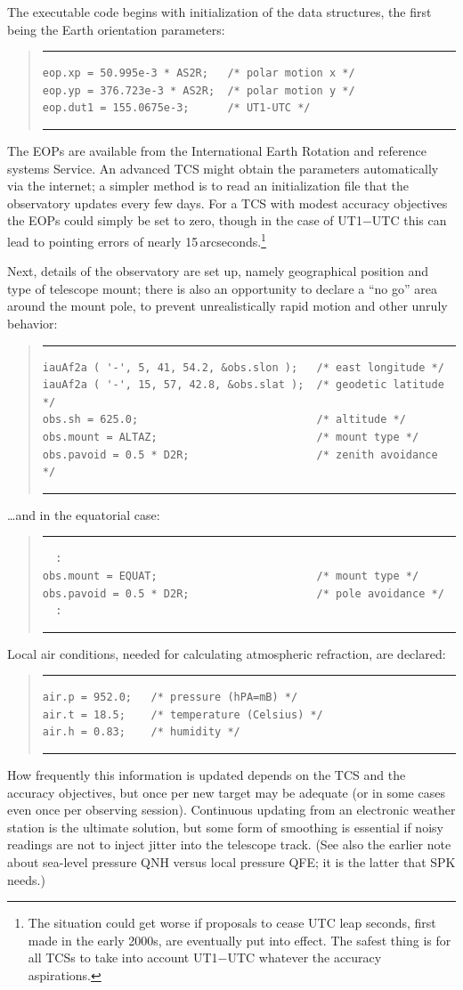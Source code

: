 \documentclass[11pt,fleqn,twoside,\paper]{article}
\renewcommand{\_}{{\tt\char'137}}     %
\newcommand{\scode}     {\goodbreak
                         \begin{quote}
                         \vspace{-6ex}
                         \rule[-2ex]{36em}{0.03ex}}
\newcommand{\ecode}     {\rule[2ex]{36em}{0.03ex}
                         \end{quote}
                         \vspace{-4ex}
                         \goodbreak}
\begin{document}
The executable code begins with initialization of the data structures,
the first being the Earth orientation parameters:
\scode\begin{verbatim}
eop.xp = 50.995e-3 * AS2R;   /* polar motion x */
eop.yp = 376.723e-3 * AS2R;  /* polar motion y */
eop.dut1 = 155.0675e-3;      /* UT1-UTC */
\end{verbatim}\ecode
The EOPs are available from the International Earth
Rotation and reference systems Service.  An advanced TCS might
obtain the parameters automatically via the internet;  a simpler
method is to read an initialization file that the observatory
updates every few days.  For a TCS with modest accuracy
objectives the EOPs could simply be set to zero, though
in the case of UT1$-$UTC this
can lead to pointing errors of nearly
15\,arcseconds.\footnote{The situation could get worse if proposals
to cease UTC leap seconds, first made in the early 2000s, are
eventually put into effect.  The safest thing is for all TCSs to
take into account UT1$-$UTC whatever the accuracy aspirations.}

Next, details of the observatory are set up, namely
geographical position and type of telescope mount;  there is also
an opportunity to declare a ``no go'' area around the mount
pole, to prevent unrealistically rapid motion and other unruly
behavior:
\scode\begin{verbatim}
iauAf2a ( '-', 5, 41, 54.2, &obs.slon );   /* east longitude */
iauAf2a ( '-', 15, 57, 42.8, &obs.slat );  /* geodetic latitude */
obs.sh = 625.0;                            /* altitude */
obs.mount = ALTAZ;                         /* mount type */
obs.pavoid = 0.5 * D2R;                    /* zenith avoidance */
\end{verbatim}\ecode
\ldots and in the equatorial case:
\scode\begin{verbatim}
  :
obs.mount = EQUAT;                         /* mount type */
obs.pavoid = 0.5 * D2R;                    /* pole avoidance */
  :
\end{verbatim}\ecode
Local air conditions, needed for calculating atmospheric
refraction, are declared:
\scode\begin{verbatim}
air.p = 952.0;   /* pressure (hPA=mB) */
air.t = 18.5;    /* temperature (Celsius) */
air.h = 0.83;    /* humidity */
\end{verbatim}\ecode
How frequently this information is updated depends on the
TCS and the accuracy objectives, but once per new target may
be adequate (or in some cases even once per observing session).
Continuous updating from an electronic weather station is the
ultimate solution, but some form of smoothing is essential if
noisy readings are not to inject jitter into the telescope
track.  (See also the earlier note about sea-level pressure
QNH versus local pressure QFE;  it is the latter that SPK
needs.)
\end{document}
